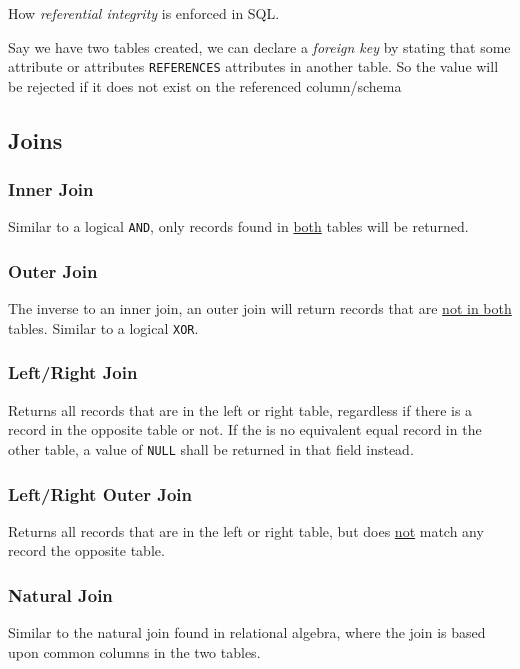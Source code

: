 \documentclass{article}
\begin{document}
How \textit{referential integrity} is enforced in SQL.

Say we have two tables created, we can declare a \textit{foreign key} by stating that some attribute or attributes \texttt{REFERENCES} attributes in another table. So the value will be rejected if it does not exist on the referenced column/schema

\subsection{Joins}

\subsubsection*{Inner Join}

Similar to a logical \texttt{AND}, only records found in \underline{both} tables will be returned.

\subsubsection*{Outer Join}

The inverse to an inner join, an outer join will return records that are \underline{not in both} tables. Similar to a logical \texttt{XOR}.

\subsubsection*{Left/Right Join}

Returns all records that are in the left or right table, regardless if there is a record in the opposite table or not. If the is no equivalent equal record in the other table, a value of \texttt{NULL} shall be returned in that field instead.

\subsubsection*{Left/Right Outer Join}

Returns all records that are in the left or right table, but does \underline{not} match any record the opposite table.

\subsubsection*{Natural Join}

Similar to the natural join found in relational algebra, where the join is based upon common columns in the two tables.
\end{document}

